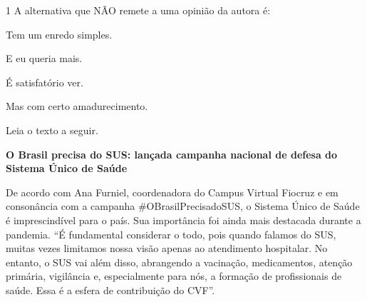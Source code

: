 \num{1} A alternativa que NÃO remete a uma opinião da autora é:

\begin{multicols}{2}
\begin{escolha}
\item Tem um enredo simples.
\item E eu queria mais.
\item É satisfatório ver.
\item Mas com certo amadurecimento. 
\end{escolha}
\end{multicols}



Leia o texto a seguir.

\begin{myquote}
\begin{center}
\textbf{O Brasil precisa do SUS: lançada campanha nacional de defesa do
Sistema Único de Saúde}
\end{center}

\noindent De acordo com Ana Furniel, coordenadora do Campus Virtual Fiocruz e em
consonância com a campanha \#OBrasilPrecisadoSUS, o Sistema Único de
Saúde é imprescindível para o país. Sua importância foi ainda mais
destacada durante a pandemia. ``É fundamental considerar o todo, pois
quando falamos do SUS, muitas vezes limitamos nossa visão apenas ao
atendimento hospitalar. No entanto, o SUS vai além disso, abrangendo a
vacinação, medicamentos, atenção primária, vigilância e, especialmente
para nós, a formação de profissionais de saúde. Essa é a esfera de
contribuição do CVF''.

\end{myquote}

